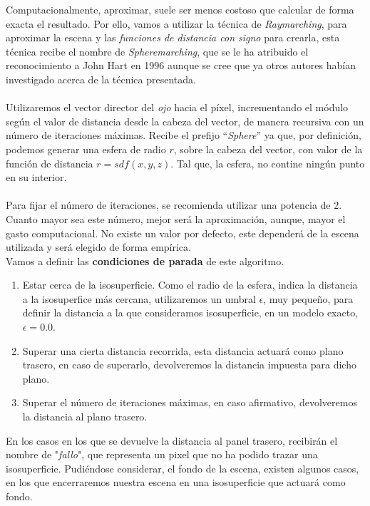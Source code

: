 Computacionalmente, aproximar, suele ser menos costoso que calcular de forma exacta el resultado. Por ello, vamos a utilizar la técnica de \textit{Raymarching}, para aproximar la escena y las \textit{funciones de distancia con signo} para crearla, esta técnica recibe el nombre de \textit{Spheremarching}, que se le ha atribuido el reconocimiento a John Hart en 1996 aunque  se cree que ya otros autores habían investigado acerca de la técnica presentada. \\\\
Utilizaremos el vector director del \textit{ojo} hacia el píxel, incrementando el módulo según el valor de distancia desde la cabeza del vector, de manera recursiva con un número de iteraciones máximas. Recibe el prefijo \enquote{\textit{Sphere}\textendash} ya que, por definición, podemos generar una esfera de radio \(r\), sobre la cabeza del vector, con valor de la función de distancia \(r=sdf(x,y,z)\). Tal que, la esfera, no contine ningún punto en su interior.\\\\
Para fijar el número de iteraciones, se recomienda utilizar una potencia de \(2\). Cuanto mayor sea este número, mejor será la aproximación, aunque, mayor el gasto computacional. No existe un valor por defecto, este dependerá de la escena utilizada y será elegido de forma empírica.\\
Vamos a definir las \textbf{condiciones de parada} de este algoritmo.
\begin{enumerate}
    \item Estar cerca de la isosuperficie. Como el radio de la esfera, indica la distancia a la isosuperfice más cercana, utilizaremos un umbral \(\epsilon\), muy pequeño, para definir la distancia a la que consideramos isosuperficie, en un modelo exacto, \(\epsilon=0.0\).
    \item Superar una cierta distancia recorrida, esta distancia actuará como plano trasero, en caso de superarlo, devolveremos la distancia impuesta para dicho plano. 
    \item Superar el número de iteraciones máximas, en caso afirmativo, devolveremos la distancia al plano trasero.
\end{enumerate}
 En los casos en los que se devuelve la distancia al panel trasero, recibirán el nombre de "\textit{fallo}", que representa un pixel que no ha podido trazar una isosuperficie. Pudiéndose considerar, el fondo de la escena, existen algunos casos, en los que encerraremos nuestra escena en una isosuperficie que actuará como fondo.

